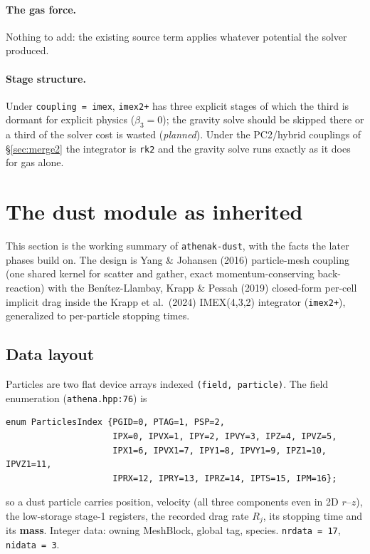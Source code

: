 \documentclass[11pt]{article}
\newcommand{\code}[1]{\texttt{#1}}
\newcommand{\file}[1]{\texttt{\small #1}}
\begin{document}
\paragraph{The gas force.} Nothing to add: the existing source term applies whatever
potential the solver produced.

\paragraph{Stage structure.} Under \code{coupling = imex}, \code{imex2+} has three
explicit stages of which the third is dormant for explicit physics ($\beta_3 = 0$);
the gravity solve should be skipped there or a third of the solver cost is wasted
(\emph{planned}). Under the PC2/hybrid couplings of \S\ref{sec:merge2} the integrator
is \code{rk2} and the gravity solve runs exactly as it does for gas alone.

\section{The dust module as inherited}
\label{sec:module}

This section is the working summary of \code{athenak-dust}, with the facts the later
phases build on. The design is Yang \& Johansen (2016) particle-mesh coupling (one
shared kernel for scatter and gather, exact momentum-conserving back-reaction) with
the Benítez-Llambay, Krapp \& Pessah (2019) closed-form per-cell implicit drag inside
the Krapp et al.\ (2024) IMEX(4,3,2) integrator (\code{imex2+}), generalized to
per-particle stopping times.

\subsection{Data layout}

Particles are two flat device arrays indexed \code{(field, particle)}. The field
enumeration (\file{athena.hpp:76}) is
\begin{lstlisting}
enum ParticlesIndex {PGID=0, PTAG=1, PSP=2,
                     IPX=0, IPVX=1, IPY=2, IPVY=3, IPZ=4, IPVZ=5,
                     IPX1=6, IPVX1=7, IPY1=8, IPVY1=9, IPZ1=10, IPVZ1=11,
                     IPRX=12, IPRY=13, IPRZ=14, IPTS=15, IPM=16};
\end{lstlisting}
so a dust particle carries position, velocity (all three components even in 2D
$r$--$z$), the low-storage stage-1 registers, the recorded drag rate
$R_j$, its stopping time and its \textbf{mass}. Integer data: owning MeshBlock,
global tag, species. \code{nrdata = 17}, \code{nidata = 3}.
\end{document}
